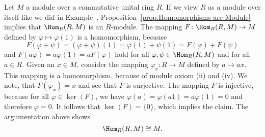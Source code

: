 \begin{rem}
Let $M$ a module over a commutative unital ring $R$. If we view $R$ as a module over itself like we did in Example~, Proposition~\ref{prop.Homomorphisms are Module} implies that $\Hom_R(R,M)$ is an $R$-module. The mapping $F\colon\Hom_R(R,M)\to M$ defined by $\varphi\mapsto\varphi(1)$ is a homomorphism, because 
\begin{equation*}
F(\varphi+\psi)=(\varphi+\psi)(1)=\varphi(1)+\psi(1)=F(\varphi)+F(\psi)
\end{equation*}
and $F(a\varphi)=a\varphi(1)=aF(\varphi)$ hold for all $\varphi,\psi\in\Hom_R(R,M)$ and for all $a\in R$. Given an $x\in M$, consider the mapping $\varphi_x\colon R\to M$ defined by $a\mapsto ax$. This mapping is a homomorphism, because of module axiom (ii) and (iv). We note, that $F(\varphi_x)=x$ and see that $F$ is surjective. The mapping $F$ is injective, because for all $\varphi\in\ker(F)$, we have $\varphi(a)=\varphi(a1)=a\varphi(1)=0$ and therefore $\varphi=0$. It follows that $\ker(F)=\lbrace 0\rbrace$, which implies the claim. The argumentation above shows
\begin{equation*}
\Hom_R(R,M)\cong M.
\end{equation*}
\end{rem}